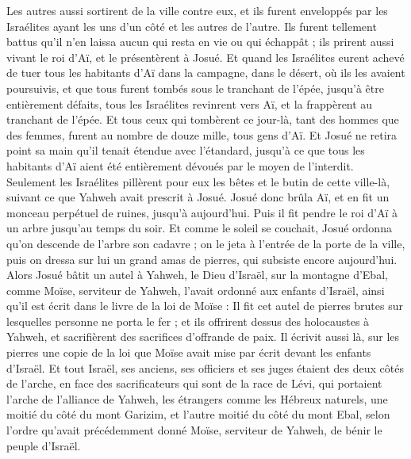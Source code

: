 \begin{multicols}{2}
Les autres aussi sortirent de la ville contre eux, et ils furent enveloppés par les Israélites ayant les uns d'un côté et les autres de l'autre. Ils furent tellement battus qu'il n'en laissa aucun qui resta en vie ou qui échappât ;
ils prirent aussi vivant le roi d'Aï, et le présentèrent à Josué.
Et quand les Israélites eurent achevé de tuer tous les habitants d'Aï dans la campagne, dans le désert, où ils les avaient poursuivis, et que tous furent tombés sous le tranchant de l'épée, jusqu'à être entièrement défaits, tous les Israélites revinrent vers Aï, et la frappèrent au tranchant de l'épée.
Et tous ceux qui tombèrent ce jour-là, tant des hommes que des femmes, furent au nombre de douze mille, tous gens d'Aï.
Et Josué ne retira point sa main qu'il tenait étendue avec l'étandard, jusqu'à ce que tous les habitants d'Aï aient été entièrement dévoués par le moyen de l'interdit.
Seulement les Israélites pillèrent pour eux les bêtes et le butin de cette ville-là, suivant ce que Yahweh avait prescrit à Josué.
Josué donc brûla Aï, et en fit un monceau perpétuel de ruines, jusqu'à aujourd'hui.
Puis il fit pendre le roi d'Aï à un arbre jusqu'au temps du soir. Et comme le soleil se couchait, Josué ordonna qu'on descende de l'arbre son cadavre ; on le jeta à l'entrée de la porte de la ville, puis on dressa sur lui un grand amas de pierres, qui subsiste encore aujourd'hui.
Alors Josué bâtit un autel à Yahweh, le Dieu d'Israël, sur la montagne d'Ebal,
comme Moïse, serviteur de Yahweh, l'avait ordonné aux enfants d'Israël, ainsi qu'il est écrit dans le livre de la loi de Moïse : Il fit cet autel de pierres brutes sur lesquelles personne ne porta le fer ; et ils offrirent dessus des holocaustes à Yahweh, et sacrifièrent des sacrifices d'offrande de paix.
Il écrivit aussi là, sur les pierres une copie de la loi que Moïse avait mise par écrit devant les enfants d'Israël.
Et tout Israël, ses anciens, ses officiers et ses juges étaient des deux côtés de l'arche, en face des sacrificateurs qui sont de la race de Lévi, qui portaient l'arche de l'alliance de Yahweh, les étrangers comme les Hébreux naturels, une moitié du côté du mont Garizim, et l'autre moitié du côté du mont Ebal, selon l'ordre qu'avait précédemment donné Moïse, serviteur de Yahweh, de bénir le peuple d'Israël.

\end{multicols}

